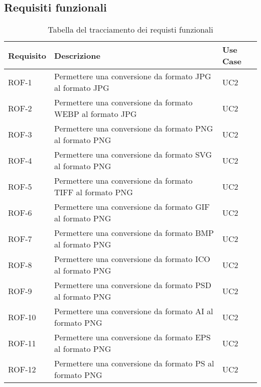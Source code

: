 \subsection{Requisiti funzionali}
\begin{table}[H]
    \caption{Tabella del tracciamento dei requisti funzionali}
    \label{tab:requisiti-funzionali}
    \begin{tabularx}{\textwidth}{lXl}
        \hline\hline
        \textbf{Requisito} & \textbf{Descrizione}                                               & \textbf{Use Case} \\
        \hline
        ROF-1              & Permettere una conversione da formato JPG al
        formato JPG        & UC2
        \\
        \hline
        ROF-2              & Permettere una conversione da formato WEBP al formato JPG          & UC2
        \\
        \hline
        ROF-3              & Permettere una conversione da formato PNG al formato PNG           & UC2
        \\
        \hline
        ROF-4              & Permettere una conversione da formato SVG al formato PNG           & UC2
        \\
        \hline
        ROF-5              & Permettere una conversione da formato TIFF al formato PNG          & UC2
        \\
        \hline
        ROF-6              & Permettere una conversione da formato GIF al formato PNG           & UC2
        \\
        \hline
        ROF-7              & Permettere una conversione da formato BMP al formato PNG           & UC2
        \\
        \hline
        ROF-8              & Permettere una conversione da formato ICO al formato PNG           & UC2
        \\
        \hline
        ROF-9              & Permettere una conversione da formato PSD al formato PNG           & UC2
        \\
        \hline
        ROF-10             & Permettere una conversione da formato AI al formato PNG            & UC2
        \\
        \hline
        ROF-11             & Permettere una conversione da formato EPS al formato PNG           & UC2
        \\
        \hline
        ROF-12             & Permettere una conversione da formato PS al formato PNG            & UC2
        \\

\end{tabularx}
\end{table}

